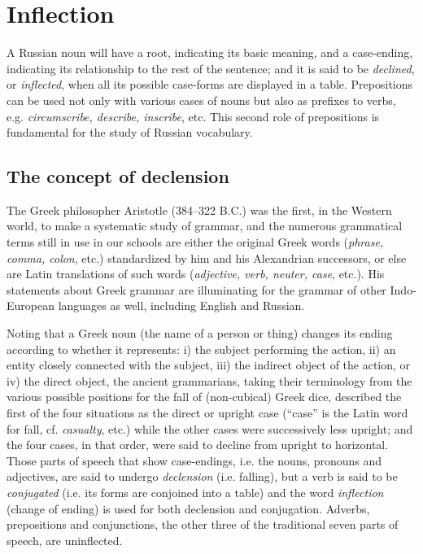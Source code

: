 \chapter{Inflection}

\begin{sourcebox}
A Russian noun will have a root, indicating its basic meaning, and a case-ending, indicating its relationship to the rest of the sentence; and it is said to be \emph{declined}, or \emph{inflected}, when all its possible case-forms are displayed in a table. Prepositions can be used not only with various cases of nouns but also as prefixes to verbs, e.g. \emph{circumscribe, describe, inscribe}, etc. This second role of prepositions is fundamental for the study of Russian vocabulary.
\end{sourcebox}

\section{The concept of declension}

The Greek philosopher Aristotle (384--322 B.C.) was the first, in the Western world, to make a systematic study of grammar, and the numerous grammatical terms still in use in our schools are either the original Greek words (\emph{phrase, comma, colon}, etc.) standardized by him and his Alexandrian successors, or else are Latin translations of such words (\emph{adjective, verb, neuter, case}, etc.). His statements about Greek grammar are illuminating for the grammar of other Indo-European languages as well, including English and Russian.

Noting that a Greek noun (the name of a person or thing) changes its ending according to whether it represents: i) the subject performing the action, ii) an entity closely connected with the subject, iii) the indirect object of the action, or iv) the direct object, the ancient grammarians, taking their terminology from the various possible positions for the fall of (non-cubical) Greek dice, described the first of the four situations as the direct or upright case (``case'' is the Latin word for fall, cf. \emph{casualty}, etc.) while the other cases were successively less upright; and the four cases, in that order, were said to decline from upright to horizontal. Those parts of speech that show case-endings, i.e. the nouns, pronouns and adjectives, are said to undergo \emph{declension} (i.e. falling), but a verb is said to be \emph{conjugated} (i.e. its forms are conjoined into a table) and the word \emph{inflection} (change of ending) is used for both declension and conjugation. Adverbs, prepositions and conjunctions, the other three of the traditional seven parts of speech, are uninflected.

